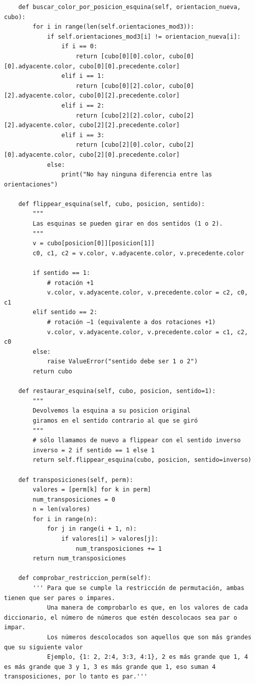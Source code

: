\begin{lstlisting}
    def buscar_color_por_posicion_esquina(self, orientacion_nueva, cubo):
        for i in range(len(self.orientaciones_mod3)):
            if self.orientaciones_mod3[i] != orientacion_nueva[i]:
                if i == 0:
                    return [cubo[0][0].color, cubo[0][0].adyacente.color, cubo[0][0].precedente.color]
                elif i == 1:
                    return [cubo[0][2].color, cubo[0][2].adyacente.color, cubo[0][2].precedente.color]
                elif i == 2:
                    return [cubo[2][2].color, cubo[2][2].adyacente.color, cubo[2][2].precedente.color]
                elif i == 3:
                    return [cubo[2][0].color, cubo[2][0].adyacente.color, cubo[2][0].precedente.color]
            else:
                print("No hay ninguna diferencia entre las orientaciones")

    def flippear_esquina(self, cubo, posicion, sentido):
        """
        Las esquinas se pueden girar en dos sentidos (1 o 2).
        """
        v = cubo[posicion[0]][posicion[1]]
        c0, c1, c2 = v.color, v.adyacente.color, v.precedente.color

        if sentido == 1:
            # rotación +1
            v.color, v.adyacente.color, v.precedente.color = c2, c0, c1
        elif sentido == 2:
            # rotación −1 (equivalente a dos rotaciones +1)
            v.color, v.adyacente.color, v.precedente.color = c1, c2, c0
        else:
            raise ValueError("sentido debe ser 1 o 2")
        return cubo

    def restaurar_esquina(self, cubo, posicion, sentido=1):
        """
        Devolvemos la esquina a su posicion original 
        giramos en el sentido contrario al que se giró
        """
        # sólo llamamos de nuevo a flippear con el sentido inverso
        inverso = 2 if sentido == 1 else 1
        return self.flippear_esquina(cubo, posicion, sentido=inverso)
    
    def transposiciones(self, perm):
        valores = [perm[k] for k in perm]
        num_transposiciones = 0
        n = len(valores)
        for i in range(n):
            for j in range(i + 1, n):
                if valores[i] > valores[j]:
                    num_transposiciones += 1
        return num_transposiciones
    
    def comprobar_restriccion_perm(self):
        ''' Para que se cumple la restricción de permutación, ambas tienen que ser pares o impares.
            Una manera de comprobarlo es que, en los valores de cada diccionario, el número de números que estén descolocaos sea par o impar.
            Los números descolocados son aquellos que son más grandes que su siguiente valor
            Ejemplo, {1: 2, 2:4, 3:3, 4:1}, 2 es más grande que 1, 4 es más grande que 3 y 1, 3 es más grande que 1, eso suman 4 transposiciones, por lo tanto es par.'''
        

\end{lstlisting}
